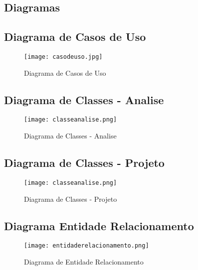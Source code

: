 \begin{landscape}
\section{Diagramas}\label{diagramas}

\subsection{Diagrama de Casos de Uso}
\begin{figure}[htb]
	\centering
	\texttt{[image: casodeuso.jpg]}
	\caption{Diagrama de Casos de Uso}
\end{figure}
\clearpage

\subsection{Diagrama de Classes - Analise}
\begin{figure}[htb]
	\centering
	\texttt{[image: classeanalise.png]}
	\caption{Diagrama de Classes - Analise}
\end{figure}
\clearpage

\subsection{Diagrama de Classes - Projeto}
\begin{figure}[htb]
	\centering
	\texttt{[image: classeanalise.png]}
	\caption{Diagrama de Classes - Projeto}
\end{figure}
\clearpage

\subsection{Diagrama Entidade Relacionamento}
\begin{figure}[htb]
	\centering
	\texttt{[image: entidaderelacionamento.png]}
	\caption{Diagrama de Entidade Relacionamento}
\end{figure}
\clearpage

\end{landscape}